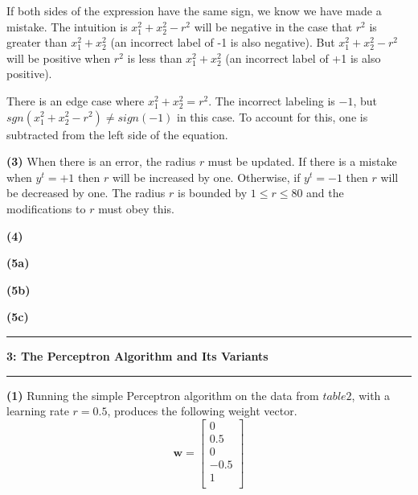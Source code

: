 \documentclass[11pt]{article}
\newcommand\question[2]{\vspace{.25in}\hrule\textbf{#1: #2}\vspace{.5em}\hrule\vspace{.10in}}
\renewcommand\part[1]{\vspace{.10in}\textbf{(#1)}}
\begin{document}

If both sides of the expression have the same sign, we know we have made a mistake. The intuition is $x_1^2 + x_2^2 - r^2$ will be negative in the case that $r^2$ is greater than $x_1^2 + x_2^2$ (an incorrect label of -1 is also negative). But $x_1^2 + x_2^2 - r^2$ will be positive when $r^2$ is less than $x_1^2 + x_2^2$ (an incorrect label of +1 is also positive). 

There is an edge case where $x_1^2 + x_2^2 = r^2$. The incorrect labeling is $-1$, but $sgn(x_1^2 + x_2^2 - r^2) \neq sign(-1)$ in this case. To account for this, one is subtracted from the left side of the equation. 

\part{3} When there is an error, the radius $r$ must be updated. If there is a mistake when $y^t = +1$ then $r$ will be increased by one. Otherwise, if $y^t = -1$ then $r$ will be decreased by one. The radius $r$ is bounded by $1 \leq r \leq 80$ and the modifications to $r$ must obey this. 



\part{4}

\part{5a}

\part{5b}

\part{5c}

\question{3}{The Perceptron Algorithm and Its Variants}

\part{1} Running the simple Perceptron algorithm on the data from $table2$, with a learning rate $r = 0.5$, produces the following weight vector.
$$\mathbf{w} = \begin{bmatrix}
    0\\
    0.5\\
    0\\
    -0.5\\
    1\\
\end{bmatrix}$$
\end{document}
